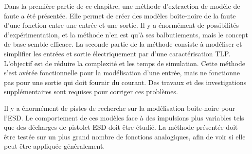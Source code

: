 Dans la première partie de ce chapitre, une méthode d'extraction de modèle de faute a été présentée.
Elle permet de créer des modèles boite-noire de la faute d'une fonction entre une entrée et une sortie.
Il y a énormément de possibilités d'expérimentation, et la méthode n'en est qu'à ses balbutiements, mais le concept de base semble efficace.
La seconde partie de la méthode consiste à modéliser et simplifier les entrées et sortie électriquement par d'une caractérisation TLP.
L'objectif est de réduire la complexité et les temps de simulation.
Cette méthode s'est avérée fonctionnelle pour la modélisation d'une entrée, mais ne fonctionne pas pour une sortie qui doit fournir du courant.
Des travaux et des investigations supplémentaires sont requises pour corriger ces problèmes.

Il y a énormément de pistes de recherche sur la modélisation boite-noire pour l'ESD.
Le comportement de ces modèles face à des impulsions plus variables tels que des décharges de pistolet ESD doit être étudié.
La méthode présentée doit être testée sur un plus grand nombre de fonctions analogiques, afin de voir si elle peut être appliquée généralement.
